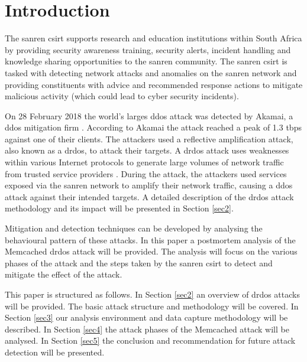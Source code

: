 \section{Introduction}
\label{sec:intro}


The \gls{sanren} \gls{csirt} supports research and education institutions within South Africa by providing security awareness training, security alerts, incident handling and knowledge sharing opportunities to the \gls{sanren} community. The \gls{sanren} \gls{csirt} is tasked with detecting network attacks and anomalies on the \gls{sanren} network and providing constituents with advice and recommended response actions to mitigate malicious activity (which could lead to cyber security incidents).

On 28 February 2018 the world's larges \gls{ddos} attack was detected by Akamai, a \gls{ddos} mitigation firm \cite{kerbs2018Powerful}. According to Akamai the attack reached a peak of 1.3 \gls{tbps} against one of their clients\cite{Akamai2018Memcached}. The attackers used a reflective amplification attack, also known as a \gls{drdos}, to attack their targets. A \gls{drdos} attack uses weaknesses within various Internet protocols to generate large volumes of network traffic from trusted service providers \cite{gibson2002distributed}.  During the attack, the attackers used services exposed via the \gls{sanren} network to amplify their network traffic, causing a \gls{ddos} attack against their intended targets. A detailed description of the \gls{drdos} attack methodology and its impact will be presented in Section \ref{sec2}.

Mitigation and detection techniques can be developed by analysing the behavioural pattern of these attacks. In this paper a postmortem analysis of the Memcached \gls{drdos} attack will be provided. The analysis will focus on the various phases of the attack and the steps taken by the \gls{sanren} \gls{csirt} to detect and mitigate the effect of the attack.

 This paper is structured as follows. In Section \ref{sec2} an overview of \gls{drdos} attacks will be provided. The basic attack structure and methodology will be covered. In Section \ref{sec3} our analysis environment and data capture methodology will be described. In Section \ref{sec4} the attack phases of the Memcached attack will be analysed. In Section \ref{sec5} the conclusion and recommendation for future attack detection will be presented.


